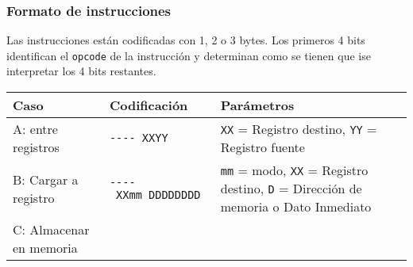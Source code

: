 \documentclass[12pt,twoside]{templates/unerthesis}
\begin{document}
\hypertarget{formato-de-instrucciones-1}{%
\subsubsection{Formato de instrucciones}\label{formato-de-instrucciones-1}}

Las instrucciones están codificadas con 1, 2 o 3 bytes. Los primeros 4 bits identifican el \texttt{opcode} de la instrucción y determinan como se tienen que ise interpretar los 4 bits restantes.

\begin{longtable}[]{@{}lll@{}}
\toprule
\begin{minipage}[b]{0.30\columnwidth}\raggedright
Caso\strut
\end{minipage} & \begin{minipage}[b]{0.30\columnwidth}\raggedright
Codificación\strut
\end{minipage} & \begin{minipage}[b]{0.30\columnwidth}\raggedright
Parámetros\strut
\end{minipage}\tabularnewline
\midrule
\endhead
\begin{minipage}[t]{0.30\columnwidth}\raggedright
A: entre registros\strut
\end{minipage} & \begin{minipage}[t]{0.30\columnwidth}\raggedright
\texttt{-\/-\/-\/-\ XXYY}\strut
\end{minipage} & \begin{minipage}[t]{0.30\columnwidth}\raggedright
\texttt{XX} = Registro destino, \texttt{YY} = Registro fuente\strut
\end{minipage}\tabularnewline
\begin{minipage}[t]{0.30\columnwidth}\raggedright
B: Cargar a registro\strut
\end{minipage} & \begin{minipage}[t]{0.30\columnwidth}\raggedright
\texttt{-\/-\/-\/-\ XXmm\ DDDDDDDD}\strut
\end{minipage} & \begin{minipage}[t]{0.30\columnwidth}\raggedright
\texttt{mm} = modo, \texttt{XX} = Registro destino, \texttt{D} = Dirección de memoria o Dato Inmediato\strut
\end{minipage}\tabularnewline
\begin{minipage}[t]{0.30\columnwidth}\raggedright
C: Almacenar en memoria\strut
\end{minipage} & \begin{minipage}[t]{0.30\columnwidth}\raggedright

\end{minipage}
\end{longtable}
\end{document}
